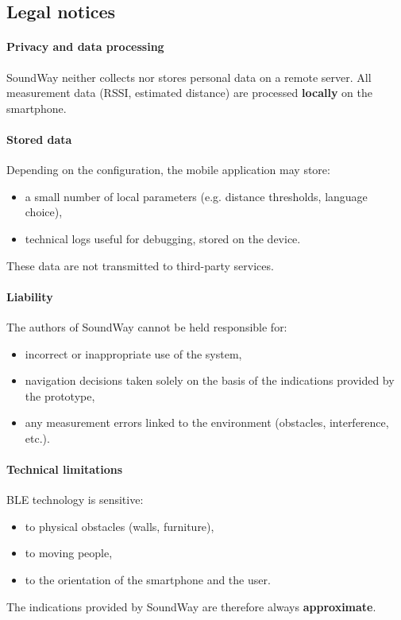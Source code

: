 \documentclass[12pt,a4paper]{article}
\begin{document}
\subsection{Legal notices}

\paragraph{Privacy and data processing}
SoundWay neither collects nor stores personal data on a remote server. All measurement data (RSSI, estimated distance) are processed \textbf{locally} on the smartphone.

\paragraph{Stored data}
Depending on the configuration, the mobile application may store:
\begin{itemize}
    \item a small number of local parameters (e.g. distance thresholds, language choice),
    \item technical logs useful for debugging, stored on the device.
\end{itemize}
These data are not transmitted to third-party services.

\paragraph{Liability}
The authors of SoundWay cannot be held responsible for:
\begin{itemize}
    \item incorrect or inappropriate use of the system,
    \item navigation decisions taken solely on the basis of the indications provided by the prototype,
    \item any measurement errors linked to the environment (obstacles, interference, etc.).
\end{itemize}

\paragraph{Technical limitations}
BLE technology is sensitive:
\begin{itemize}
    \item to physical obstacles (walls, furniture),
    \item to moving people,
    \item to the orientation of the smartphone and the user.
\end{itemize}
The indications provided by SoundWay are therefore always \textbf{approximate}.
\end{document}
